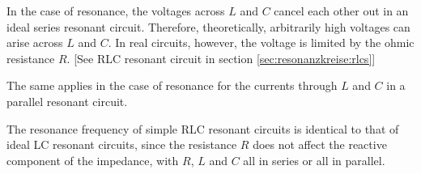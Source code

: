 \begin{frame}
{%
In the case of resonance, the voltages across $L$ and $C$ cancel each other out in an ideal series resonant circuit.
Therefore, theoretically, arbitrarily high voltages can arise across $L$ and $C$.
In real circuits, however, the voltage is limited by the ohmic resistance $R$.
[See RLC resonant circuit in section \ref{sec:resonanzkreise:rlcs}]

The same applies in the case of resonance for the currents through $L$ and $C$ in a parallel resonant circuit.

The resonance frequency of simple RLC resonant circuits is identical to that of ideal LC resonant circuits,
since the resistance $R$ does not affect the reactive component of the impedance,
with $R$, $L$ and $C$ all in series or all in parallel.

}
\end{frame}
